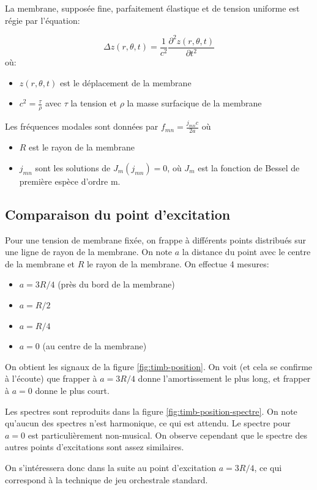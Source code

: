 \documentclass[atiam, article]{rapport} %
\begin{document}
La membrane, supposée fine, parfaitement élastique et de tension uniforme est régie par l'équation:

$$\Delta z(r,\theta, t) = \frac{1}{c^2} \frac{\partial^2 z(r,\theta,t)}{\partial t^2}$$ où:
\begin{itemize}
  \item $z(r,\theta, t)$ est le déplacement de la membrane
  \item $c^2 = \frac{\tau}{\rho}$ avec $\tau$ la tension et $\rho$ la masse surfacique de la membrane
\end{itemize}

Les fréquences modales sont données par $f_{mn} = \frac{j_{mn} c}{2a}$ où
\begin{itemize}
  \item $R$ est le rayon de la membrane
  \item $j_{mn}$ sont les solutions de $J_m(j_{mn}) = 0$, où $J_m$ est la fonction de Bessel de première espèce d'ordre m.
\end{itemize}


\subsection{Comparaison du point d'excitation}

Pour une tension de membrane fixée, on frappe à différents points distribués sur une ligne de rayon de la membrane. On note $a$ la distance du point avec le centre de la membrane et $R$ le rayon de la membrane. On effectue 4 mesures:
\begin{itemize}
  \item $a=3R/4$ (près du bord de la membrane)
  \item $a=R/2$
  \item $a=R/4$
  \item $a=0$ (au centre de la membrane)
\end{itemize}

On obtient les signaux de la figure \ref{fig:timb-position}. On voit (et cela se confirme à l'écoute) que frapper à $a=3R/4$ donne l'amortissement le plus long, et frapper à $a=0$ donne le plus court.

Les spectres sont reproduits dans la figure \ref{fig:timb-position-spectre}. On note qu'aucun des spectres n'est harmonique, ce qui est attendu. Le spectre pour $a=0$ est particulièrement non-musical. On observe cependant que le spectre des autres points d'excitations sont assez similaires.

On s'intéressera donc dans la suite au point d'excitation $a=3R/4$, ce qui correspond à la technique de jeu orchestrale standard.
\end{document}
